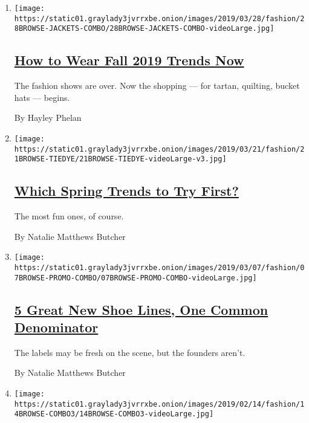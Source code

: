 \begin{enumerate}
\def\labelenumi{\arabic{enumi}.}
\item
  \texttt{[image: https://static01.graylady3jvrrxbe.onion/images/2019/03/28/fashion/28BROWSE-JACKETS-COMBO/28BROWSE-JACKETS-COMBO-videoLarge.jpg]}

  \hypertarget{how-to-wear-fall-2019-trends-now}{%
  \subsection{\texorpdfstring{\href{/2019/03/27/style/how-to-wear-fall-2019-trends-now.html}{How
  to Wear Fall 2019 Trends
  Now}}{How to Wear Fall 2019 Trends Now}}\label{how-to-wear-fall-2019-trends-now}}

  The fashion shows are over. Now the shopping --- for tartan, quilting,
  bucket hats --- begins.

  By Hayley Phelan
\item
  \texttt{[image: https://static01.graylady3jvrrxbe.onion/images/2019/03/21/fashion/21BROWSE-TIEDYE/21BROWSE-TIEDYE-videoLarge-v3.jpg]}

  \hypertarget{which-spring-trends-to-try-first}{%
  \subsection{\texorpdfstring{\href{/2019/03/20/style/spring-trends.html}{Which
  Spring Trends to Try
  First?}}{Which Spring Trends to Try First?}}\label{which-spring-trends-to-try-first}}

  The most fun ones, of course.

  By Natalie Matthews Butcher
\item
  \texttt{[image: https://static01.graylady3jvrrxbe.onion/images/2019/03/07/fashion/07BROWSE-PROMO-COMBO/07BROWSE-PROMO-COMBO-videoLarge.jpg]}

  \hypertarget{5-great-new-shoe-lines-one-common-denominator}{%
  \subsection{\texorpdfstring{\href{/2019/03/13/style/5-great-new-shoe-lines-one-common-denominator.html}{5
  Great New Shoe Lines, One Common
  Denominator}}{5 Great New Shoe Lines, One Common Denominator}}\label{5-great-new-shoe-lines-one-common-denominator}}

  The labels may be fresh on the scene, but the founders aren't.

  By Natalie Matthews Butcher
\item
  \texttt{[image: https://static01.graylady3jvrrxbe.onion/images/2019/02/14/fashion/14BROWSE-COMBO3/14BROWSE-COMBO3-videoLarge.jpg]}


\end{enumerate}
